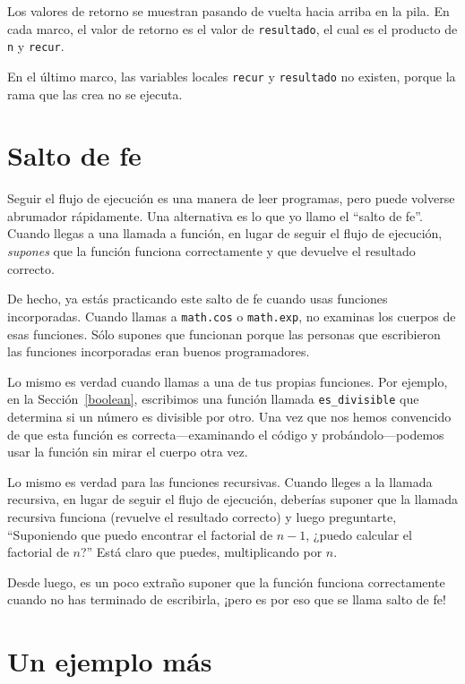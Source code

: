 \documentclass[10pt]{book}
\begin{document}
Los valores de retorno se muestran pasando de vuelta hacia arriba en la pila.  En cada
marco, el valor de retorno es el valor de {\tt resultado}, el cual es el
producto de {\tt n} y {\tt recur}.

En el último marco, las variables
locales {\tt recur} y {\tt resultado} no existen, porque
la rama que las crea no se ejecuta.


\section{Salto de fe}

Seguir el flujo de ejecución es una manera de leer programas, pero
puede volverse abrumador rápidamente.  Una
alternativa es lo que yo llamo el ``salto de fe''.  Cuando llegas a una
llamada a función, en lugar de seguir el flujo de ejecución, {\em
supones} que la función funciona correctamente y que devuelve el resultado
correcto.

De hecho, ya estás practicando este salto de fe cuando usas
funciones incorporadas.  Cuando llamas a {\tt math.cos} o {\tt math.exp},
no examinas los cuerpos de esas funciones.  Sólo
supones que funcionan porque las personas que escribieron las funciones
incorporadas eran buenos programadores.

Lo mismo es verdad cuando llamas a una de tus propias funciones.  Por
ejemplo, en la Sección~\ref{boolean}, escribimos una función llamada
\verb"es_divisible" que determina si un número es divisible por
otro.  Una vez que nos hemos convencido de que esta función es
correcta---examinando el código y probándolo---podemos usar la función
sin mirar el cuerpo otra vez.

Lo mismo es verdad para las funciones recursivas.  Cuando lleges a la llamada
recursiva, en lugar de seguir el flujo de ejecución, deberías suponer
que la llamada recursiva funciona (revuelve el resultado correcto) y luego
preguntarte, ``Suponiendo que puedo encontrar el factorial de $n-1$, ¿puedo
calcular el factorial de $n$?''  Está claro que
puedes, multiplicando por $n$.

Desde luego, es un poco extraño suponer que la función funciona
correctamente cuando no has terminado de escribirla, ¡pero es por eso
que se llama salto de fe!


\section{Un ejemplo más}
\label{one.more.example}
\end{document}
